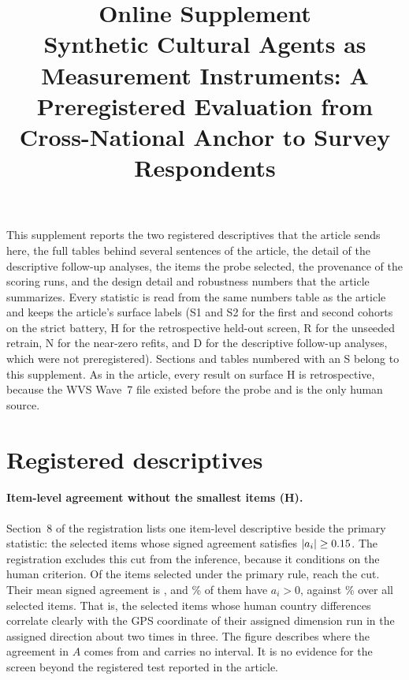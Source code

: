 \documentclass[12pt]{article}
\title{Online Supplement\\[0.6em]\large Synthetic Cultural Agents as Measurement Instruments: A Preregistered Evaluation from Cross-National Anchor to Survey Respondents}
\author{}
\date{}
\begin{document}
\maketitle
\thispagestyle{empty}

\noindent This supplement reports the two registered descriptives that the article sends here, the full tables behind several sentences of the article, the detail of the descriptive follow-up analyses, the items the probe selected, the provenance of the scoring runs, and the design detail and robustness numbers that the article summarizes. Every statistic is read from the same numbers table as the article and keeps the article's surface labels (S1 and S2 for the first and second cohorts on the strict battery, H for the retrospective held-out screen, R for the unseeded retrain, N for the near-zero refits, and D for the descriptive follow-up analyses, which were not preregistered). Sections and tables numbered with an S belong to this supplement. As in the article, every result on surface H is retrospective, because the WVS Wave~7 file existed before the probe and is the only human source.

\section{Registered descriptives}\label{sec:s-desc}

\paragraph{Item-level agreement without the smallest items (H).} Section~8 of the registration lists one item-level descriptive beside the primary statistic: the selected items whose signed agreement satisfies $|a_i|\geq \dc{0.15}{abs_a_cut}$. The registration excludes this cut from the inference, because it conditions on the human criterion. Of the  items selected under the primary rule,  reach the cut. Their mean signed agreement is , and \% of them have $a_i>0$, against \% over all  selected items. That is, the selected items whose human country differences correlate clearly with the GPS coordinate of their assigned dimension run in the assigned direction about two times in three. The figure describes where the agreement in $A$ comes from and carries no interval. It is no evidence for the screen beyond the registered test reported in the article.
\end{document}
